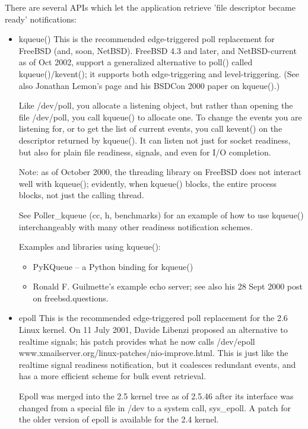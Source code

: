\documentclass[12pt, twoside, a4paper, xetex]{report}
\begin{document}
There are several APIs which let the application retrieve 'file descriptor became ready' notifications:
\begin{itemize}

	\item kqueue() This is the recommended edge-triggered poll replacement for FreeBSD (and, soon, NetBSD).
FreeBSD 4.3 and later, and NetBSD-current as of Oct 2002, support a generalized alternative to poll() called kqueue()/kevent(); it supports both edge-triggering and level-triggering. (See also Jonathan Lemon's page and his BSDCon 2000 paper on kqueue().)

Like /dev/poll, you allocate a listening object, but rather than opening the file /dev/poll, you call kqueue() to allocate one. To change the events you are listening for, or to get the list of current events, you call kevent() on the descriptor returned by kqueue(). It can listen not just for socket readiness, but also for plain file readiness, signals, and even for I/O completion.

Note: as of October 2000, the threading library on FreeBSD does not interact well with kqueue(); evidently, when kqueue() blocks, the entire process blocks, not just the calling thread.

See Poller\_kqueue (cc, h, benchmarks) for an example of how to use kqueue() interchangeably with many other readiness notification schemes.

Examples and libraries using kqueue():

\begin{itemize}
\item PyKQueue -- a Python binding for kqueue()
\item Ronald F. Guilmette's example echo server; see also his 28 Sept 2000 post on freebsd.questions.
\end{itemize}

\item epoll
This is the recommended edge-triggered poll replacement for the 2.6 Linux kernel.
On 11 July 2001, Davide Libenzi proposed an alternative to realtime signals; his patch provides what he now calls /dev/epoll www.xmailserver.org/linux-patches/nio-improve.html. This is just like the realtime signal readiness notification, but it coalesces redundant events, and has a more efficient scheme for bulk event retrieval.

Epoll was merged into the 2.5 kernel tree as of 2.5.46 after its interface was changed from a special file in /dev to a system call, sys\_epoll. A patch for the older version of epoll is available for the 2.4 kernel.


\end{itemize}
\end{document}

